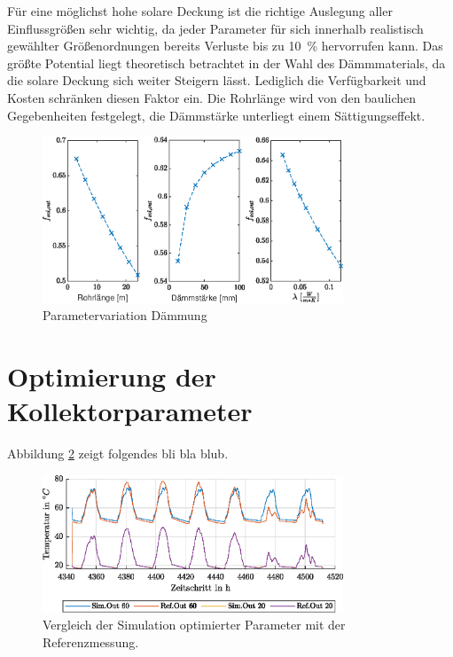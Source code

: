 Für eine möglichst hohe solare Deckung ist die richtige Auslegung aller Einflussgrößen sehr wichtig, da jeder Parameter für sich innerhalb realistisch gewählter Größenordnungen bereits Verluste bis zu \SI{10}{\percent} hervorrufen kann. Das größte Potential liegt theoretisch betrachtet in der Wahl des Dämmmaterials, da die solare Deckung sich weiter Steigern lässt. Lediglich die Verfügbarkeit und Kosten schränken diesen Faktor ein. Die Rohrlänge wird von den baulichen Gegebenheiten festgelegt, die Dämmstärke unterliegt einem Sättigungseffekt.

\begin{figure}[H]
	\centering
	\includegraphics[width=0.8\textwidth]{../DATA/Aufgabe2.3.eps}
	\caption[Parametervariation Dämmung]{Parametervariation Dämmung}
	\label{fig:par2}
\end{figure}


\section{Optimierung der Kollektorparameter}

Abbildung \ref{fig:comp} zeigt folgendes bli bla blub.

\begin{figure}[H]
	\centering
	\includegraphics[width=0.8\textwidth]{../DATA/Aufgabe3vergleich.eps}
	\caption[Vergleich Optimierung-Referenz]{Vergleich der Simulation optimierter Parameter mit der Referenzmessung.}
	\label{fig:comp}
\end{figure}

